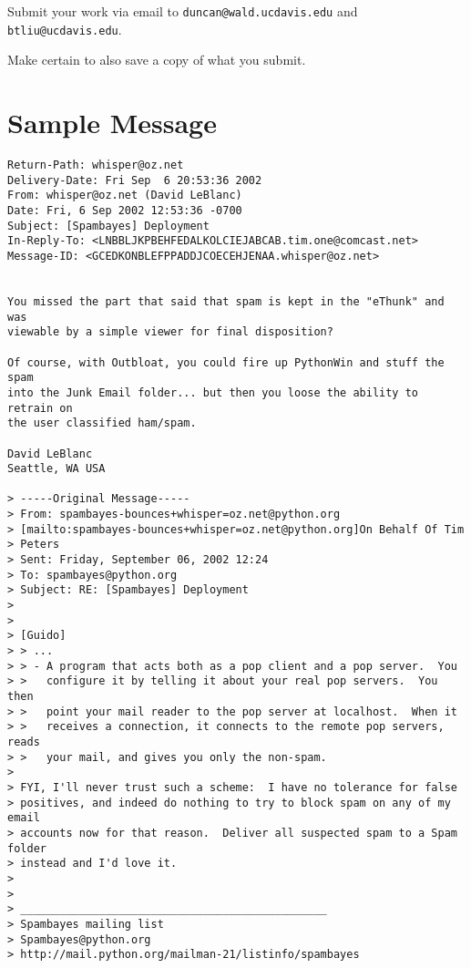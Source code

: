 \documentclass[10pt]{article}
\makeatletter
\def\InstructorMail{\texttt{duncan@wald.ucdavis.edu}}
\def\TAMail{\texttt{btliu@ucdavis.edu}}
\makeatother
\begin{document}
Submit your work via email to \InstructorMail{} and \TAMail{}.

Make certain to also save a copy of what you submit.



\section{Sample Message}

\begin{verbatim}
Return-Path: whisper@oz.net
Delivery-Date: Fri Sep  6 20:53:36 2002
From: whisper@oz.net (David LeBlanc)
Date: Fri, 6 Sep 2002 12:53:36 -0700
Subject: [Spambayes] Deployment
In-Reply-To: <LNBBLJKPBEHFEDALKOLCIEJABCAB.tim.one@comcast.net>
Message-ID: <GCEDKONBLEFPPADDJCOECEHJENAA.whisper@oz.net>
                                                                                
                                                                                You missed the part that said that spam is kept in the "eThunk" and was
viewable by a simple viewer for final disposition?

Of course, with Outbloat, you could fire up PythonWin and stuff the spam
into the Junk Email folder... but then you loose the ability to retrain on
the user classified ham/spam.

David LeBlanc
Seattle, WA USA

> -----Original Message-----
> From: spambayes-bounces+whisper=oz.net@python.org
> [mailto:spambayes-bounces+whisper=oz.net@python.org]On Behalf Of Tim
> Peters
> Sent: Friday, September 06, 2002 12:24
> To: spambayes@python.org
> Subject: RE: [Spambayes] Deployment
>
>
> [Guido]
> > ...
> > - A program that acts both as a pop client and a pop server.  You
> >   configure it by telling it about your real pop servers.  You then
> >   point your mail reader to the pop server at localhost.  When it
> >   receives a connection, it connects to the remote pop servers, reads
> >   your mail, and gives you only the non-spam.
>
> FYI, I'll never trust such a scheme:  I have no tolerance for false
> positives, and indeed do nothing to try to block spam on any of my email
> accounts now for that reason.  Deliver all suspected spam to a Spam folder
> instead and I'd love it.
>
>
> _______________________________________________
> Spambayes mailing list
> Spambayes@python.org
> http://mail.python.org/mailman-21/listinfo/spambayes
\end{verbatim}
\end{document}
